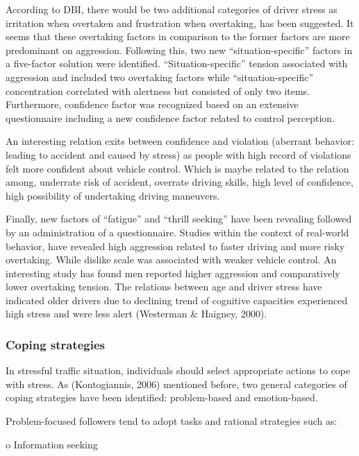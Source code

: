 \documentclass[
11pt, %
oneside, %
english, %
singlespacing, %
]{macthesis} %
\begin{document}
According to DBI, there would be two additional categories of driver stress as irritation when overtaken and frustration when overtaking, has been suggested. It seems that these overtaking factors in comparison to the former factors are more predominant on aggression. Following this, two new ``situation-specific'' factors in a five-factor solution were identified. ``Situation-specific'' tension associated with aggression and included two overtaking factors while ``situation-specific'' concentration correlated with alertness but consisted of only two items. Furthermore, confidence factor was recognized based on an extensive questionnaire including a new confidence factor related to control perception.

An interesting relation exits between confidence and violation (aberrant behavior: leading to accident and caused by stress) as people with high record of violations felt more confident about vehicle control. Which is maybe related to the relation among, underrate risk of accident, overrate driving skills, high level of confidence, high possibility of undertaking driving maneuvers.

Finally, new factors of ``fatigue'' and ``thrill seeking'' have been revealing followed by an administration of a questionnaire. Studies within the context of real-world behavior, have revealed high aggression related to faster driving and more risky overtaking. While dislike scale was associated with weaker vehicle control. An interesting study has found men reported higher aggression and comparatively lower overtaking tension. The relations between age and driver stress have indicated older drivers due to declining trend of cognitive capacities experienced high stress and were less alert (Westerman \& Haigney, 2000).

\hypertarget{coping-strategies}{%
\subsubsection{Coping strategies}\label{coping-strategies}}

In stressful traffic situation, individuals should select appropriate actions to cope with stress. As (Kontogiannis, 2006) mentioned before, two general categories of coping strategies have been identified: problem-based and emotion-based.

Problem-focused followers tend to adopt tasks and rational strategies such as:

o Information seeking
\end{document}
